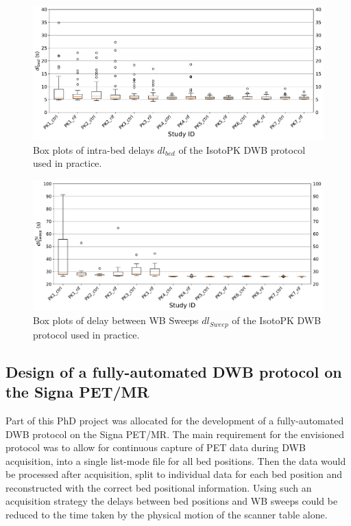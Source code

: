 \begin{figure} [ht!]
\centering
\includegraphics[scale=0.5,angle=0]{3_Results/3_1_DWB_Optimization/figures/3_1_BoxPlots_DTBeds.pdf}
\caption{Box plots of intra-bed delays $dl_{bed}$ of the IsotoPK DWB protocol used in practice.} 
\label{fig3_1:BoxPlots_beds}
\end{figure}
%
\begin{figure} [ht!]
\centering
\includegraphics[scale=0.5,angle=0]{3_Results/3_1_DWB_Optimization/figures/3_1_BoxPlots_DTSweeps.pdf}
\caption{Box plots of delay between WB Sweeps $dl_{Sweep}$ of the IsotoPK DWB protocol used in practice.}
\label{fig3_1:BoxPlots_sweeps}
\end{figure}
%
%
%
\subsection{Design of a fully-automated DWB protocol on the Signa PET/MR}
Part of this PhD project was allocated for the development of a fully-automated DWB protocol on the Signa PET/MR. 
The main requirement for the envisioned protocol was to allow for continuous capture of PET data during DWB acquisition, into a single list-mode file for all bed positions. Then the data would be processed after acquisition, split to individual data for each bed position and reconstructed with the correct bed positional information. Using such an acquisition strategy the delays between bed positions and WB sweeps could be reduced to the time taken by the physical motion of the scanner table alone. 


